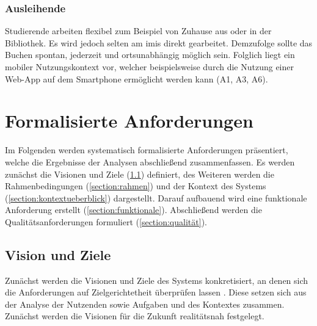 \subsubsection{Ausleihende}
Studierende arbeiten flexibel zum Beispiel von Zuhause aus oder in der
Bibliothek. Es wird jedoch selten am \ac{imis} direkt gearbeitet. Demzufolge
sollte das Buchen spontan, jederzeit und ortsunabhängig möglich sein. Folglich
liegt ein mobiler Nutzungskontext vor, welcher beispielsweise durch die Nutzung
einer Web-App auf dem Smartphone ermöglicht werden kann (A1, A3, A6).


\section{Formalisierte Anforderungen}
\label{section:anforderung}

Im Folgenden werden systematisch formalisierte Anforderungen präsentiert, welche
die Ergebnisse der Analysen abschließend zusammenfassen. Es werden zunächst die
Visionen und Ziele (\ref{section:visionziel}) definiert, des Weiteren werden die
Rahmenbedingungen (\ref{section:rahmen}) und der Kontext des Systems
(\ref{section:kontextueberblick}) dargestellt. Darauf aufbauend wird eine
funktionale Anforderung erstellt (\ref{section:funktionale}). Abschließend
werden die Qualitätsanforderungen formuliert (\ref{section:qualität}).


\subsection{Vision und Ziele}
\label{section:visionziel}
Zunächst werden die Visionen und Ziele des Systems konkretisiert, an denen sich
die Anforderungen auf Zielgerichtetheit überprüfen lassen \cite{Balzert2009}.
Diese setzen sich aus der Analyse der Nutzenden sowie Aufgaben und des Kontextes
zusammen. Zunächst werden die Visionen für die Zukunft realitätsnah festgelegt.

